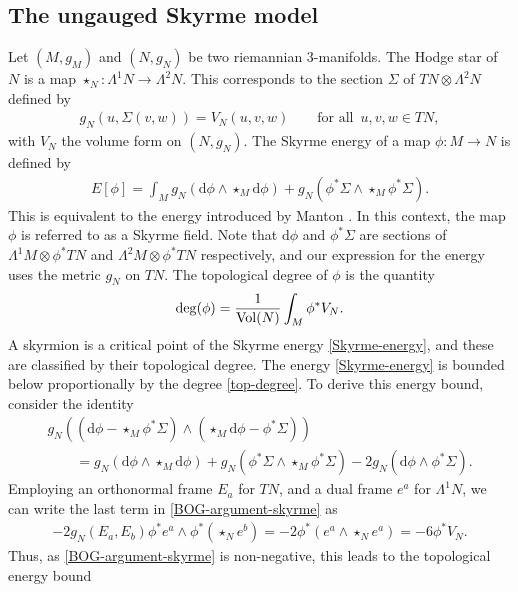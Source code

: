 \documentclass[pdftex]{sigma}
\newcommand{\1}{{\mathbb{1}}}
\def \d{\mathrm{d}}
\numberwithin{equation}{section}
\begin{document}
\subsection{The ungauged Skyrme model}
Let $(M,g_M)$ and $(N,g_N)$ be two riemannian 3-manifolds. The Hodge star of $N$ is a map $\star_{N}\colon \Lambda^1N\to\Lambda^2N$. This corresponds to the section $\Sigma$ of $TN\otimes\Lambda^2N$ defined by
\begin{align}\label{Hodge-star-def}
 g_N(u,\Sigma(v,w))=V_N(u,v,w) \qquad\text{for all }\,u,v,w\in TN,
\end{align}
with $V_N$ the volume form on $(N,g_N)$. The Skyrme energy of a map $\phi\colon M\to N$ is defined by
\begin{align}\label{Skyrme-energy}
E[\phi]=\int_Mg_N(\d\phi\wedge\star_{M} \d\phi) + g_N(\phi^\ast\Sigma\wedge\star_{M}\phi^\ast\Sigma).
\end{align}
This is equivalent to the energy introduced by Manton \cite{Manton1987geometry}. In this context, the map $\phi$ is referred to as a Skyrme field. Note that $\d\phi$ and $\phi^\ast\Sigma$ are sections of $\Lambda^1 M\otimes \phi^\ast TN$ and $\Lambda^2 M\otimes \phi^\ast TN$ respectively, and our expression for the energy uses the metric $g_N$ on $TN$. The topological degree of $\phi$ is the quantity
\begin{align}\label{top-degree}
 \deg(\phi)=\frac{1}{{\rm Vol}(N)}\int_M\phi^\ast V_N.
\end{align}
A skyrmion is a critical point of the Skyrme energy \eqref{Skyrme-energy}, and these are classified by their topological degree. The energy \eqref{Skyrme-energy} is bounded below proportionally by the degree \eqref{top-degree}. To derive this energy bound, consider the identity
\begin{gather}
g_N ((\d\phi-\star_{M}\phi^\ast\Sigma)\wedge(\star_{M} \d\phi-\phi^\ast\Sigma) )\nonumber\\
\qquad{} =g_N(\d\phi\wedge\star_{M} \d\phi) + g_N(\phi^\ast\Sigma\wedge\star_{M}\phi^\ast\Sigma) - 2g_N(\d\phi\wedge\phi^\ast\Sigma).\label{BOG-argument-skyrme}
\end{gather}
Employing an orthonormal frame $E_a$ for $TN$, and a dual frame $e^a$ for $\Lambda^1N$, we can write the last term in \eqref{BOG-argument-skyrme} as
\begin{align}\label{ip-volume-pullback}
-2g_N(E_a,E_b)\phi^\ast e^a \wedge\phi^\ast(\star_{N} e^b)=-2\phi^\ast (e^a\wedge\star_{N} e^a)=-6\phi^\ast V_N.
\end{align}
Thus, as \eqref{BOG-argument-skyrme} is non-negative, this leads to the topological energy bound
\end{document}
